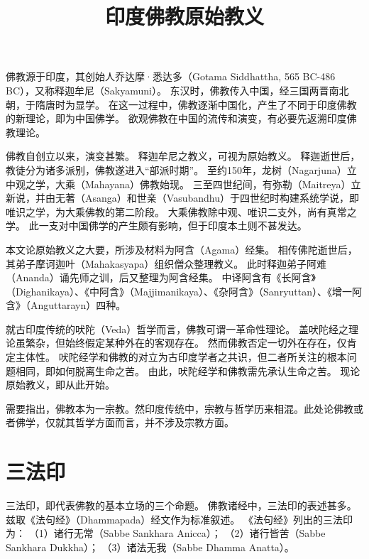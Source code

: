 \documentclass[11pt]{article}
\title{印度佛教原始教义}
\date{}
\begin{document}
  \maketitle

  \linenumbers

佛教源于印度，其创始人乔达摩·悉达多（Gotama Siddhattha, 565 BC-486 BC），又称释迦牟尼（Sakyamuni）。
东汉时，佛教传入中国，经三国两晋南北朝，于隋唐时为显学。
在这一过程中，佛教逐渐中国化，产生了不同于印度佛教的新理论，即为中国佛学。
欲观佛教在中国的流传和演变，有必要先返溯印度佛教理论。

\newline

佛教自创立以来，演变甚繁。
释迦牟尼之教义，可视为原始教义。
释迦逝世后，教徒分为诸多派别，佛教遂进入“部派时期”。
至约150年，龙树（Nagarjuna）立中观之学，大乘（Mahayana）佛教始现。
三至四世纪间，有弥勒（Maitreya）立新说，并由无著（Asanga）和世亲（Vasubandhu）于四世纪时构建系统学说，即唯识之学，为大乘佛教的第二阶段。
大乘佛教除中观、唯识二支外，尚有真常之学。
此一支对中国佛学的产生颇有影响，但于印度本土则不甚发达。

\newline

本文论原始教义之大要，所涉及材料为阿含（Agama）经集。
相传佛陀逝世后，其弟子摩诃迦叶（Mahakasyapa）组织僧众整理教义。
此时释迦弟子阿难（Ananda）诵先师之训，后又整理为阿含经集。
中译阿含有《长阿含》（Dighanikaya）、《中阿含》（Majjimanikaya）、《杂阿含》（Sanryuttan）、《增一阿含》（Anguttarayn）四种。

\newline

就古印度传统的吠陀（Veda）哲学而言，佛教可谓一革命性理论。
盖吠陀经之理论虽繁杂，但始终假定某种外在的客观存在。
然而佛教否定一切外在存在，仅肯定主体性。
吠陀经学和佛教的对立为古印度学者之共识，但二者所关注的根本问题相同，即如何脱离生命之苦。
由此，吠陀经学和佛教需先承认生命之苦。
现论原始教义，即从此开始。

\newline

需要指出，佛教本为一宗教。然印度传统中，宗教与哲学历来相混。此处论佛教或者佛学，仅就其哲学方面而言，并不涉及宗教方面。
    
\section{三法印}
三法印，即代表佛教的基本立场的三个命题。
佛教诸经中，三法印的表述甚多。
兹取《法句经》（Dhammapada）经文作为标准叙述。
《法句经》列出的三法印为：
（1）诸行无常（Sabbe Sankhara Anicca）；
（2）诸行皆苦（Sabbe Sankhara Dukkha）；
（3）诸法无我（Sabbe Dhamma Anatta）。
\end{document}
